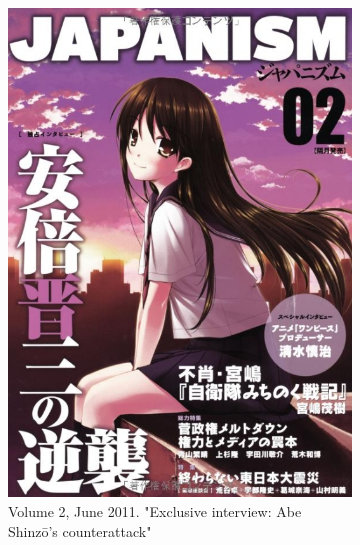 \documentclass[10pt,british,A4paper,,openany]{memoir}
\begin{document}
\begin{figure}[!htb]
 \centering
 \begin{subfigure}[b]{0.30\textwidth}
  \includegraphics[width=\textwidth]{images/japanism1.jpg}
  \caption{Volume 2, June 2011. "Exclusive interview: Abe Shinzō's counterattack"}
  \label{fig:twitter1}
 \end{subfigure}
  \begin{subfigure}[b]{0.30\textwidth}

\end{subfigure}
\end{figure}
\end{document}
